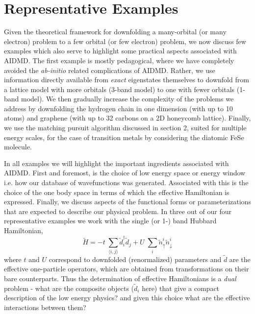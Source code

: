 \section{Representative Examples}

Given the theoretical framework for downfolding a many-orbital (or many electron) problem to a 
few orbital (or few electron) problem, we now discuss few examples which also serve to highlight some practical aspects 
associated with AIDMD. The first example is mostly pedagogical, 
where we have completely avoided the \textit{ab-initio} related complications of AIDMD. Rather, we use information directly available 
from \textit{exact} eigenstates themselves to downfold from a lattice model with more orbitals (3-band model) 
to one with fewer orbitals (1-band model). We then gradually increase the complexity of the problems we address 
by downfolding the hydrogen chain in one dimension (with up to 10 atoms) and graphene 
(with up to 32 carbons on a 2D honeycomb lattice). Finally, we use the matching pursuit algorithm discussed 
in section 2, suited for multiple energy scales, for the case of transition metals 
by considering the diatomic FeSe molecule.

In all examples we will highlight the important ingredients associated with AIDMD. First and foremost, is the choice 
of low energy space or energy window i.e. how our database of wavefunctions was generated. Associated with this is 
the choice of the one body space in terms of which the effective Hamiltonian is expressed. Finally, we discuss 
aspects of the functional forms or parameterizations that are expected to describe our physical 
problem. In three out of our four representative examples we work with the single (or 1-) band Hubbard Hamiltonian,
\begin{equation}
	\tilde{H} = -t \;\sum_{\langle i,j \rangle} \tilde{d}_i^{\dagger} \tilde{d}_j + U \;\sum_{i} \tilde{n}^{i}_{\uparrow} \tilde{n}^{i}_{\downarrow}
\label{eq:oneband}
\end{equation}
where $t$ and $U$ correspond to downfolded (renormalized) parameters and $\tilde{d}$ are the effective one-particle operators, 
which are obtained from transformations on their bare counterparts. Thus 
the determination of effective Hamiltonians is a \emph{dual} problem - what are the composite objects ($\tilde{d}_i$ here) 
that give a compact description of the low energy physics? and given this choice what 
are the effective interactions between them?

